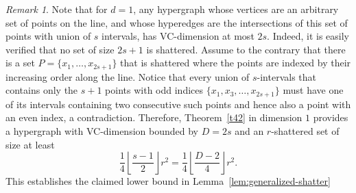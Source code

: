 \documentclass[11pt]{article}
\theoremstyle{plain}
\newtheorem{theorem}{Theorem}[section]
\theoremstyle{definition}
\theoremstyle{remark}
\newtheorem{remark}[theorem]{Remark}
\begin{document}
\begin{remark}
    Note that for $d=1$, any hypergraph whose vertices are an arbitrary set of points on the line, and whose  hyperedges are the intersections of this set of points with union of $s$ intervals, has VC-dimension at most $2s$. 
    Indeed, it is easily verified that no set of size $2s+1$ is shattered.
    Assume to the contrary that there is a set $P=\{x_1,\ldots,x_{2s+1}\}$ that is shattered where the points are indexed by their increasing order along the line. Notice that every union of $s$-intervals that contains only the $s+1$ points with odd indices $\{x_1,x_3,\ldots, x_{2s+1}\}$ must have one of its intervals containing two consecutive such points and hence also a point with an even index, a contradiction.  Therefore, Theorem~\ref{t42} in dimension $1$ provides a hypergraph with VC-dimension bounded by $D=2s$ and an $r$-shattered set of size 
    at least 
    $$\frac{1}{4} \left \lfloor \frac{s-1}{2} \right \rfloor r^2= \frac{1}{4} \left \lfloor \frac{D-2}{4} \right \rfloor r^2.$$
    This establishes the claimed lower bound in Lemma~\ref{lem:generalized-shatter}
    
\end{remark}

\end{document}
